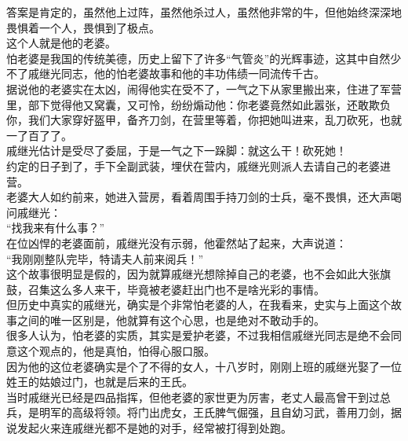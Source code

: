 \begin{multicols}{\theparacolNo}
答案是肯定的，虽然他上过阵，虽然他杀过人，虽然他非常的牛，但他始终深深地畏惧着一个人，畏惧到了极点。\\

这个人就是他的老婆。\\

怕老婆是我国的传统美德，历史上留下了许多“气管炎”的光辉事迹，这其中自然少不了戚继光同志，他的怕老婆故事和他的丰功伟绩一同流传千古。\\

据说他的老婆实在太凶，闹得他实在受不了，一气之下从家里搬出来，住进了军营里，部下觉得他又窝囊，又可怜，纷纷煽动他：你老婆竟然如此嚣张，还敢欺负你，我们大家穿好盔甲，备齐刀剑，在营里等着，你把她叫进来，乱刀砍死，也就一了百了了。\\

戚继光估计是受尽了委屈，于是一气之下一跺脚：就这么干！砍死她！\\

约定的日子到了，手下全副武装，埋伏在营内，戚继光则派人去请自己的老婆进营。\\

老婆大人如约前来，她进入营房，看着周围手持刀剑的士兵，毫不畏惧，还大声喝问戚继光：\\

“找我来有什么事？”\\

在位凶悍的老婆面前，戚继光没有示弱，他霍然站了起来，大声说道：\\

“我刚刚整队完毕，特请夫人前来阅兵！”\\

这个故事很明显是假的，因为就算戚继光想除掉自己的老婆，也不会如此大张旗鼓，召集这么多人来干，毕竟被老婆赶出门也不是啥光彩的事情。\\

但历史中真实的戚继光，确实是个非常怕老婆的人，在我看来，史实与上面这个故事之间的唯一区别是，他就算有这个心思，也是绝对不敢动手的。\\

很多人认为，怕老婆的实质，其实是爱护老婆，不过我相信戚继光同志是绝不会同意这个观点的，他是真怕，怕得心服口服。\\

因为他的这位老婆确实是个了不得的女人，十八岁时，刚刚上班的戚继光娶了一位姓王的姑娘过门，也就是后来的王氏。\\

当时戚继光已经是四品指挥，但他老婆的家世更为厉害，老丈人最高曾干到过总兵，是明军的高级将领。将门出虎女，王氏脾气倔强，且自幼习武，善用刀剑，据说发起火来连戚继光都不是她的对手，经常被打得到处跑。\\


\end{multicols}
